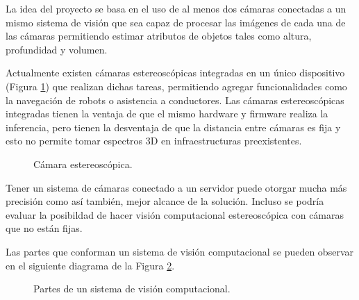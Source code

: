\documentclass[
11pt, %
]{charter}
\begin{document}
La idea del proyecto se basa en el uso de al menos dos cámaras conectadas a un mismo sistema de visión que sea capaz de procesar las imágenes de cada una de las cámaras permitiendo estimar atributos de objetos tales como altura, profundidad y volumen. 

Actualmente existen cámaras estereoscópicas integradas en un único dispositivo (Figura \ref{fig:camera}) que realizan dichas tareas, permitiendo agregar funcionalidades como la navegación de robots o asistencia a conductores. Las cámaras estereoscópicas integradas tienen la ventaja de que el mismo hardware y firmware realiza la inferencia, pero tienen la desventaja de que la distancia entre cámaras es fija y esto no permite tomar espectros 3D en infraestructuras preexistentes. 

\begin{figure}[H]
\centering
{}
\caption{Cámara estereoscópica.}
\label{fig:camera}
\end{figure}

Tener un sistema de cámaras conectado a un servidor puede otorgar mucha más precisión como así también, mejor alcance de la solución. Incluso se podría evaluar la posibildad de hacer visión computacional estereoscópica con cámaras que no están fijas.

Las partes que conforman un sistema de visión computacional se pueden observar en el siguiente diagrama de la Figura \ref{fig:system}.

\begin{figure}[H]
\centering
{}
\caption{Partes de un sistema de visión computacional.}
\label{fig:system}
\end{figure}
\end{document}
